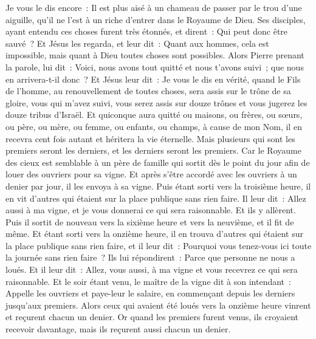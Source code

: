 \begin{multicols}{2}
Je vous le dis encore~: Il est plus aisé à un chameau de passer par le trou d'une aiguille, qu'il ne l'est à un riche d'entrer dans le Royaume de Dieu.
Ses disciples, ayant entendu ces choses furent très étonnés, et dirent~: Qui peut donc être sauvé~?
Et Jésus les regarda, et leur dit~: Quant aux hommes, cela est impossible, mais quant à Dieu toutes choses sont possibles.
Alors Pierre prenant la parole, lui dit~: Voici, nous avons tout quitté et nous t'avons suivi~; que nous en arrivera-t-il donc~?
Et Jésus leur dit~: Je vous le dis en vérité, quand le Fils de l'homme, au renouvellement de toutes choses, sera assis sur le trône de sa gloire, vous qui m'avez suivi, vous serez assis sur douze trônes et vous jugerez les douze tribus d'Israël.
Et quiconque aura quitté ou maisons, ou frères, ou sœurs, ou père, ou mère, ou femme, ou enfants, ou champs, à cause de mon Nom, il en recevra cent fois autant et héritera la vie éternelle.
Mais plusieurs qui sont les premiers seront les derniers, et les derniers seront les premiers.
\VerseOne{} Car le Royaume des cieux est semblable à un père de famille qui sortit dès le point du jour afin de louer des ouvriers pour sa vigne.
Et après s'être accordé avec les ouvriers à un denier par jour, il les envoya à sa vigne.
Puis étant sorti vers la troisième heure, il en vit d'autres qui étaient sur la place publique sans rien faire.
Il leur dit~: Allez aussi à ma vigne, et je vous donnerai ce qui sera raisonnable.
Et ils y allèrent. Puis il sortit de nouveau vers la sixième heure et vers la neuvième, et il fit de même.
Et étant sorti vers la onzième heure, il en trouva d'autres qui étaient sur la place publique sans rien faire, et il leur dit~: Pourquoi vous tenez-vous ici toute la journée sans rien faire~?
Ils lui répondirent~: Parce que personne ne nous a loués. Et il leur dit~: Allez, vous aussi, à ma vigne et vous recevrez ce qui sera raisonnable.
Et le soir étant venu, le maître de la vigne dit à son intendant~: Appelle les ouvriers et paye-leur le salaire, en commençant depuis les derniers jusqu'aux premiers.
Alors ceux qui avaient été loués vers la onzième heure vinrent et reçurent chacun un denier.
Or quand les premiers furent venus, ils croyaient recevoir davantage, mais ils reçurent aussi chacun un denier.

\end{multicols}
